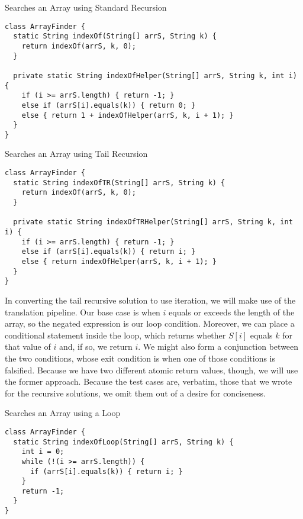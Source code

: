\begin{cl}{Searches an Array using Standard Recursion}
\begin{lstlisting}[language=MyJava]
class ArrayFinder {
  static String indexOf(String[] arrS, String k) {
    return indexOf(arrS, k, 0);
  }

  private static String indexOfHelper(String[] arrS, String k, int i) {
    if (i >= arrS.length) { return -1; } 
    else if (arrS[i].equals(k)) { return 0; } 
    else { return 1 + indexOfHelper(arrS, k, i + 1); }
  } 
}
\end{lstlisting}
\end{cl}

\begin{cl}{Searches an Array using Tail Recursion}
\begin{lstlisting}[language=MyJava]
class ArrayFinder {
  static String indexOfTR(String[] arrS, String k) {
    return indexOf(arrS, k, 0);
  }

  private static String indexOfTRHelper(String[] arrS, String k, int i) {
    if (i >= arrS.length) { return -1; } 
    else if (arrS[i].equals(k)) { return i; } 
    else { return indexOfHelper(arrS, k, i + 1); }
  } 
}
\end{lstlisting}
\end{cl}

In converting the tail recursive solution to use iteration, we will make use of the translation pipeline. Our base case is when $i$ equals or exceeds the length of the array, so the negated expression is our loop condition. Moreover, we can place a conditional statement inside the loop, which returns whether $S[i]$ equals $k$ for that value of $i$ and, if so, we return $i$. We might also form a conjunction between the two conditions, whose exit condition is when one of those conditions is falsified. Because we have two different atomic return values, though, we will use the former approach. Because the test cases are, verbatim, those that we wrote for the recursive solutions, we omit them out of a desire for conciseness.

\begin{cl}{Searches an Array using a  Loop}
\begin{lstlisting}[language=MyJava]
class ArrayFinder {
  static String indexOfLoop(String[] arrS, String k) {
    int i = 0;
    while (!(i >= arrS.length)) {
      if (arrS[i].equals(k)) { return i; }
    }
    return -1;
  }
}
\end{lstlisting}
\end{cl}

